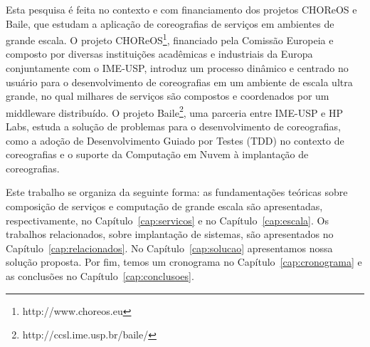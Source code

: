 Esta pesquisa é feita no contexto e com financiamento dos projetos CHOReOS e Baile, que estudam a aplicação de coreografias de serviços em ambientes de grande escala. O projeto CHOReOS\footnote{http://www.choreos.eu}, financiado pela Comissão Europeia e composto por diversas instituições acadêmicas e industriais da Europa conjuntamente com o IME-USP, introduz um processo dinâmico e centrado no usuário para o desenvolvimento de coreografias em um ambiente de escala ultra grande, no qual milhares de serviços são compostos e coordenados por um middleware distribuído. O projeto Baile\footnote{http://ccsl.ime.usp.br/baile/}, uma parceria entre IME-USP e HP Labs, estuda a solução de problemas para o desenvolvimento de coreografias, como a adoção de Desenvolvimento Guiado por Testes (TDD) no contexto de coreografias e o suporte da Computação em Nuvem à implantação de coreografias.

Este trabalho se organiza da seguinte forma: as fundamentações teóricas sobre composição de serviços e computação de grande escala são apresentadas, respectivamente, no Capítulo~\ref{cap:servicos} e no Capítulo~\ref{cap:escala}. Os trabalhos relacionados, sobre implantação de sistemas, são apresentados no Capítulo~\ref{cap:relacionados}. No Capítulo~\ref{cap:solucao} apresentamos nossa solução proposta. Por fim, temos um cronograma no Capítulo~\ref{cap:cronograma} e as conclusões no Capítulo~\ref{cap:conclusoes}. 


%
%
%
%
